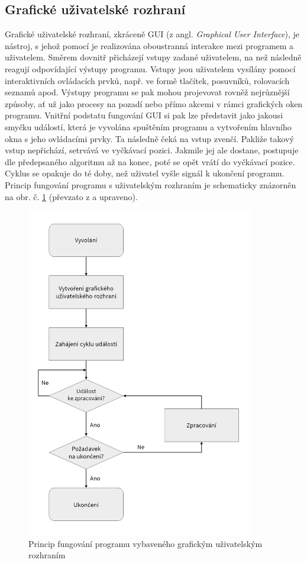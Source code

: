 \documentclass[a4paper, 12pt]{article}
\begin{document}
\subsection{Grafické uživatelské rozhraní} \label{sec:GUI}
Grafické uživatelské rozhraní, zkráceně GUI (z angl. \textit{Graphical User Interface}), je nástroj, s jehož pomocí je realizována oboustranná interakce mezi programem a uživatelem. Směrem dovnitř přicházejí vstupy zadané uživatelem, na než následně reagují odpovídající výstupy programu. Vstupy jsou uživatelem vysílány pomocí interaktivních ovládacích prvků, např. ve formě tlačítek, posuvníků, rolovacích seznamů apod. Výstupy programu se pak mohou projevovat rovněž nejrůznější způsoby, ať už jako procesy na pozadí nebo přímo akcemi v rámci grafických oken programu. Vnitřní podstatu fungování GUI si pak lze představit jako jakousi  smyčku událostí, která je vyvolána spuštěním programu a vytvořením hlavního okna s jeho ovládacími prvky. Ta následně čeká na vstup zvenčí. Pakliže takový vstup nepřichází, setrvává ve vyčkávací pozici. Jakmile jej ale dostane, postupuje dle předepsaného algoritmu až na konec, poté se opět vrátí do vyčkávací pozice. Cyklus se opakuje do té doby, než uživatel vyšle signál k ukončení programu. Princip fungování programu s uživatelským rozhraním je schematicky znázorněn na obr. č. \ref{fig:Gui} (převzato z \cite{Python3Summerfield:2} a upraveno).

\begin{figure}[ht!]
    \centering
    \includegraphics[width=0.8\linewidth,height=14.5cm]{gui_princip.png}\vspace{0.25cm}
    \caption{Princip fungování programu vybaveného grafickým uživatelským rozhraním}
    \label{fig:Gui}
\end{figure}
\end{document}
